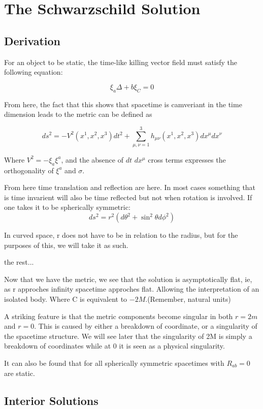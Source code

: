 \section{The Schwarzschild Solution}
\subsection{Derivation}
For an object to be static, the time-like killing vector field must satisfy the following equation:

\[
\xi_{a}\Delta+b \xi_{C}=0
  \]

  From here, the fact that this shows that spacetime is camveriant in the time dimension leads to the metric can be defined as

\[
ds^2=-V^2(x^1,x^2,x^3)dt^2+ \sum_{\mu,\nu = 1}^3 h_{\mu \nu}(x^1,x^2,x^3)dx^\mu dx^\nu
  \]

  Where $V^2=-\xi_a \xi^a$, and the absence of $dt$ $dx^\mu$ cross terms expresses the orthogonality of $\xi^a$ and $\sigma$.

From here time translation and reflection are here. In most cases something that is time invarient will also be time reflected but not when rotation is involved. If one takes it to be spherically symmetric:
\[
    ds^2 = r^2(d\theta^2+\sin^2\theta d\phi^2)
  \]

  In curved space, r does not have to be in relation to the radius, but for the purposes of this, we will take it as such.


  the rest...



  Now that we have the metric, we see that the solution is asymptotically flat, ie, as r approches infinity spacetime approches flat. Allowing the interpretation of an isolated body. Where C is equivalent to $-2M$.(Remember, natural units)

  A striking feature is that the metric components become singular in both $r=2m$ and $r=0$. This is caused by either a breakdown of coordinate, or a singularity of the spacetime structure. We will see later that the singularity of 2M is simply a breakdown of coordinates while at 0 it is seen as a physical singularity.

  It can also be found that for all spherically symmetric spacetimes with $R_{ab}=0$ are static.

\subsection{Interior Solutions}

